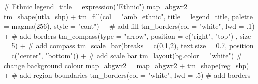 \documentclass[
  letterpaper,
  DIV=11,
  numbers=noendperiod,
  oneside]{scrreprt}
\newenvironment{Shaded}{\begin{snugshade}}{\end{snugshade}}
\newcommand{\AttributeTok}[1]{\textcolor[rgb]{0.40,0.45,0.13}{#1}}
\newcommand{\CommentTok}[1]{\textcolor[rgb]{0.37,0.37,0.37}{#1}}
\newcommand{\DecValTok}[1]{\textcolor[rgb]{0.68,0.00,0.00}{#1}}
\newcommand{\FloatTok}[1]{\textcolor[rgb]{0.68,0.00,0.00}{#1}}
\newcommand{\FunctionTok}[1]{\textcolor[rgb]{0.28,0.35,0.67}{#1}}
\newcommand{\NormalTok}[1]{\textcolor[rgb]{0.00,0.23,0.31}{#1}}
\newcommand{\OtherTok}[1]{\textcolor[rgb]{0.00,0.23,0.31}{#1}}
\newcommand{\SpecialCharTok}[1]{\textcolor[rgb]{0.37,0.37,0.37}{#1}}
\newcommand{\StringTok}[1]{\textcolor[rgb]{0.13,0.47,0.30}{#1}}
\begin{document}
\begin{Shaded}
\begin{Highlighting}[]
  \CommentTok{\# Ethnic}
\NormalTok{legend\_title }\OtherTok{=} \FunctionTok{expression}\NormalTok{(}\StringTok{"Ethnic"}\NormalTok{)}
\NormalTok{map\_abgwr2 }\OtherTok{=} \FunctionTok{tm\_shape}\NormalTok{(utla\_shp) }\SpecialCharTok{+}
  \FunctionTok{tm\_fill}\NormalTok{(}\AttributeTok{col =} \StringTok{"amb\_ethnic"}\NormalTok{, }\AttributeTok{title =}\NormalTok{ legend\_title, }\AttributeTok{palette =} \FunctionTok{magma}\NormalTok{(}\DecValTok{256}\NormalTok{), }\AttributeTok{style =} \StringTok{"cont"}\NormalTok{) }\SpecialCharTok{+} \CommentTok{\# add fill}
  \FunctionTok{tm\_borders}\NormalTok{(}\AttributeTok{col =} \StringTok{"white"}\NormalTok{, }\AttributeTok{lwd =}\NormalTok{ .}\DecValTok{1}\NormalTok{)  }\SpecialCharTok{+} \CommentTok{\# add borders}
  \FunctionTok{tm\_compass}\NormalTok{(}\AttributeTok{type =} \StringTok{"arrow"}\NormalTok{, }\AttributeTok{position =} \FunctionTok{c}\NormalTok{(}\StringTok{"right"}\NormalTok{, }\StringTok{"top"}\NormalTok{) , }\AttributeTok{size =} \DecValTok{5}\NormalTok{) }\SpecialCharTok{+} \CommentTok{\# add compass}
  \FunctionTok{tm\_scale\_bar}\NormalTok{(}\AttributeTok{breaks =} \FunctionTok{c}\NormalTok{(}\DecValTok{0}\NormalTok{,}\DecValTok{1}\NormalTok{,}\DecValTok{2}\NormalTok{), }\AttributeTok{text.size =} \FloatTok{0.7}\NormalTok{, }\AttributeTok{position =}  \FunctionTok{c}\NormalTok{(}\StringTok{"center"}\NormalTok{, }\StringTok{"bottom"}\NormalTok{)) }\SpecialCharTok{+} \CommentTok{\# add scale bar}
  \FunctionTok{tm\_layout}\NormalTok{(}\AttributeTok{bg.color =} \StringTok{"white"}\NormalTok{) }\CommentTok{\# change background colour}
\NormalTok{map\_abgwr2 }\OtherTok{=}\NormalTok{ map\_abgwr2 }\SpecialCharTok{+} \FunctionTok{tm\_shape}\NormalTok{(reg\_shp) }\SpecialCharTok{+} \CommentTok{\# add region boundaries}
  \FunctionTok{tm\_borders}\NormalTok{(}\AttributeTok{col =} \StringTok{"white"}\NormalTok{, }\AttributeTok{lwd =}\NormalTok{ .}\DecValTok{5}\NormalTok{) }\CommentTok{\# add borders}


\end{Highlighting}
\end{Shaded}
\end{document}
